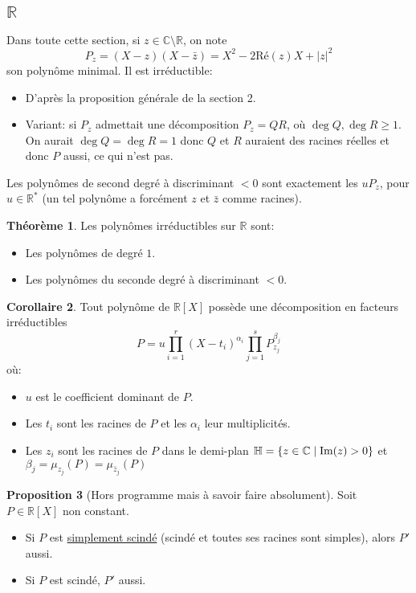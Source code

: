 \documentclass[10pt,a4paper]{article}
\theoremstyle{definition}
\newtheorem{proposition}{Proposition}[section]
\newtheorem{theorem}[proposition]{Théorème}
\newtheorem{corollaire}[proposition]{Corollaire}
\begin{document}
\subsection{$\mathbb{R}$}
Dans toute cette section, si $z \in \mathbb{C} \setminus \mathbb{R}$, on note
\[P_z = (X - z)(X - \bar{z}) = X^2 - 2\text{Ré}(z)X + |z|^2\]
son polynôme minimal. Il est irréductible:
\begin{itemize}
\item D'après la proposition générale de la section 2.
\item Variant: si $P_z$ admettait une décomposition $P_z = QR$, où $\deg{Q}, \deg{R} \geq 1$. On aurait $\deg{Q} = \deg{R} = 1$ donc $Q$ et $R$ auraient des racines réelles et donc $P$ aussi, ce qui n'est pas.
\end{itemize}
Les polynômes de second degré à discriminant $< 0$ sont exactement les $u P_z$, pour $u \in \mathbb{R}^*$ (un tel polynôme a forcément $z$ et $\bar{z}$ comme racines).
\begin{theorem}
Les polynômes irréductibles sur $\mathbb{R}$ sont:
\begin{itemize}
\item Les polynômes de degré $1$.
\item Les polynômes du seconde degré à discriminant $< 0$.
\end{itemize}
\end{theorem}
\begin{corollaire}
Tout polynôme de $\mathbb{R}[X]$ possède une décomposition en facteurs irréductibles
\[P = u \prod\limits_{i = 1}^{r} (X - t_i)^{\alpha_i} \prod\limits_{j = 1}^{s} P_{z_j}^{\beta_j}\]
où:
\begin{itemize}
\item $u$ est le coefficient dominant de $P$.
\item Les $t_i$ sont les racines de $P$ et les $\alpha_i$ leur multiplicités.
\item Les $z_i$ sont les racines de $P$ dans le demi-plan $\mathbb{H} = \{ z \in \mathbb{C} \mid \textup{Im}(z) > 0 \}$ et $\beta_j = \mu_{z_j}(P) = \mu_{\bar{z}_j}(P)$
\end{itemize}
\end{corollaire}

\begin{proposition}[Hors programme mais à savoir faire absolument]
Soit $P \in \mathbb{R}[X]$ non constant.
\begin{itemize}
\item Si $P$ est \uline{simplement scindé} (scindé et toutes ses racines sont simples), alors $P'$ aussi.
\item Si $P$ est scindé, $P'$ aussi.
\end{itemize}
\end{proposition}
\end{document}
